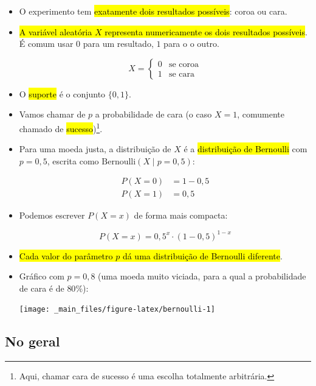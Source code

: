 \documentclass[
  11pt]{report}
\begin{document}
\begin{itemize}
\item
  O experimento tem {\hl{exatamente dois resultados possíveis}}: coroa ou cara.
\item
  {\hl{A variável aleatória $X$ representa numericamente os dois resultados possíveis}}. É comum usar $0$ para um resultado, $1$ para o o outro.

  \[
  X = \begin{cases}
        0 &\text{se coroa} \\
        1 &\text{se cara}
      \end{cases}
  \]
\item
  O {\hl{suporte}} é o conjunto $\{0, 1\}$.
\item
  Vamos chamar de $p$ a probabilidade de cara (o caso $X = 1$, comumente chamado de {\hl{sucesso}})\footnote{Aqui, chamar cara de sucesso é uma escolha totalmente arbitrária.}.
\item
  Para uma moeda justa, a distribuição de $X$ é a {\hl{distribuição de Bernoulli}} com $p=0{,}5$, escrita como $\text{Bernoulli}(X \mid p = 0{,}5)$:

  \[
  \begin{aligned}
    P(X = 0) &= 1 - 0{,}5 \\
    P(X = 1) &= 0{,}5 
  \end{aligned}
  \]
\item
  Podemos escrever $P(X=x)$ de forma mais compacta:

  \[
  P(X = x) = 0{,}5^x \cdot (1 - 0{,}5)^{1 - x}
  \]
\item
  {\hl{Cada valor do parâmetro $p$ dá uma distribuição de Bernoulli diferente}}.
\item
  Gráfico com $p = 0{,}8$ (uma moeda muito viciada, para a qual a probabilidade de cara é de $80\%$):

  \begin{center}\texttt{[image: \_main\_files/figure-latex/bernoulli-1]} \end{center}
\end{itemize}

\hypertarget{no-geral-2}{%
\subsection{No geral}\label{no-geral-2}}
\end{document}
